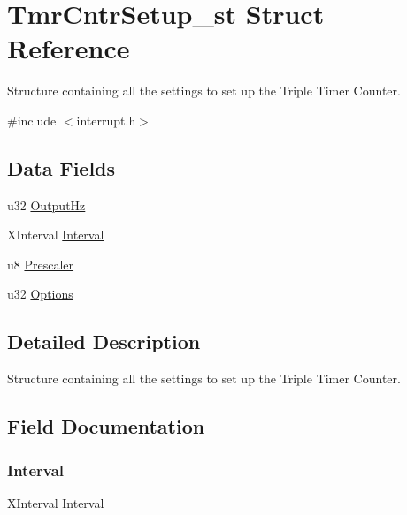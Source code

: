 \hypertarget{struct_tmr_cntr_setup__st}{}\section{Tmr\+Cntr\+Setup\+\_\+st Struct Reference}
\label{struct_tmr_cntr_setup__st}


Structure containing all the settings to set up the Triple Timer Counter.  




{\ttfamily \#include $<$interrupt.\+h$>$}

\subsection*{Data Fields}
\begin{DoxyCompactItemize}
\item 
u32 \mbox{\hyperlink{struct_tmr_cntr_setup__st_a09e90f1e06a66bdf74ef386385c0d0de}{Output\+Hz}}
\item 
X\+Interval \mbox{\hyperlink{struct_tmr_cntr_setup__st_a244bdbbadd7f4b89879df6efa487ead8}{Interval}}
\item 
u8 \mbox{\hyperlink{struct_tmr_cntr_setup__st_a7a429dcd1272baccc893723d7e236ca9}{Prescaler}}
\item 
u32 \mbox{\hyperlink{struct_tmr_cntr_setup__st_ae2514b28dbf5f74aa6f8a4b8621dda8b}{Options}}
\end{DoxyCompactItemize}


\subsection{Detailed Description}
Structure containing all the settings to set up the Triple Timer Counter. 

\subsection{Field Documentation}
\mbox{\label{struct_tmr_cntr_setup__st_a244bdbbadd7f4b89879df6efa487ead8}} 
\subsubsection{\texorpdfstring{Interval}{Interval}}
{\footnotesize\ttfamily X\+Interval Interval}

